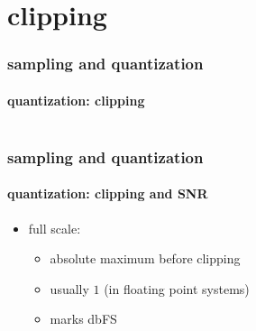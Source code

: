 \section[clipping]{clipping}

	\begin{frame}\frametitle{sampling and quantization}\framesubtitle{quantization: clipping}
        \begin{columns}
	    \vspace{-5mm}
            
            \bigskip
            \bigskip
            \bigskip
            \smallskip
             
            \bigskip
            \bigskip
            \smallskip
            
        \end{columns}
	\end{frame}	
	
	\begin{frame}\frametitle{sampling and quantization}\framesubtitle{quantization: clipping and SNR}
        
     \begin{itemize}
         \item[] full scale:
            \begin{itemize}
                \item   absolute maximum before clipping
                \item   usually $1$ (in floating point systems)
                \item   marks \unit[0]{dbFS}
            \end{itemize}
     \end{itemize}
	\end{frame}
	


